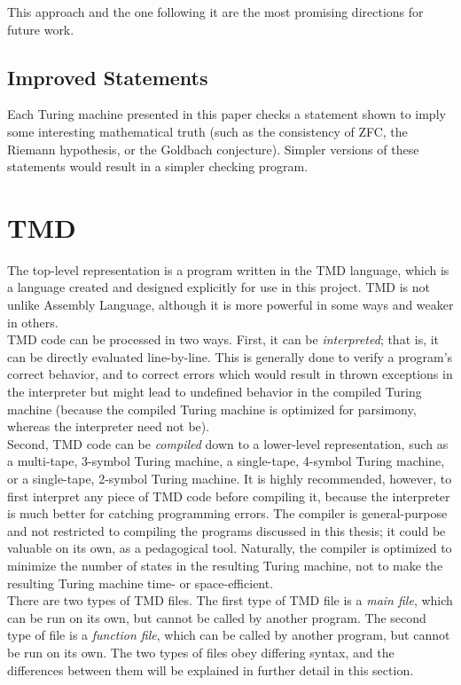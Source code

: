 \documentclass[11pt]{report}
\begin{document}
This approach and the one following it are the most promising directions for future work.

\subsection{Improved Statements}

Each Turing machine presented in this paper checks a statement shown to imply some interesting mathematical truth (such as the consistency of ZFC, the Riemann hypothesis, or the Goldbach conjecture). Simpler versions of these statements would result in a simpler checking program.

\section{TMD}

The top-level representation is a program written in the TMD language, which is a language created and designed explicitly for use in this project. TMD is not unlike Assembly Language, although it is more powerful in some ways and weaker in others. \\

TMD code can be processed in two ways. First, it can be \emph{interpreted}; that is, it can be directly evaluated line-by-line. This is generally done to verify a program's correct behavior, and to correct errors which would result in thrown exceptions in the interpreter but might lead to undefined behavior in the compiled Turing machine (because the compiled Turing machine is optimized for parsimony, whereas the interpreter need not be). \\

Second, TMD code can be \emph{compiled} down to a lower-level representation, such as a multi-tape, 3-symbol Turing machine, a single-tape, 4-symbol Turing machine, or a single-tape, 2-symbol Turing machine. It is highly recommended, however, to first interpret any piece of TMD code before compiling it, because the interpreter is much better for catching programming errors. The compiler is general-purpose and not restricted to compiling the programs discussed in this thesis; it could be valuable on its own, as a pedagogical tool. Naturally, the compiler is optimized to minimize the number of states in the resulting Turing machine, not to make the resulting Turing machine time- or space-efficient. \\

There are two types of TMD files. The first type of TMD file is a \emph{main file}, which can be run on its own, but cannot be called by another program. The second type of file is a \emph{function file}, which can be called by another program, but cannot be run on its own. The two types of files obey differing syntax, and the differences between them will be explained in further detail in this section. \\
\end{document}
